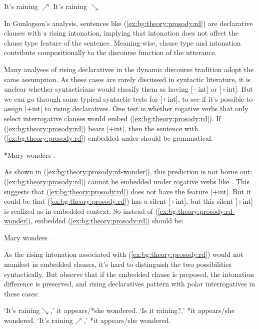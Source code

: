 It's raining $\nearrow$
\eex
{}
It's raining $\searrow$
\eex


In Gunlogson's \cite*{gunlogson2008} analysis, sentences like (\ref{ex:bg:theory:prosody:rd}) are declarative clauses with a rising intonation, implying that intonation does not affect the clause type feature of the sentence. Meaning-wise, clause type and intonation contribute compositionally to the discourse function of the utterance. 


Many analyses of rising declaratives in the dynamic discourse tradition adopt the same assumption. As these cases are rarely discussed in syntactic literature, it is unclear whether syntacticians would classify them as having [$-$int] or [$+$int]. But we can go through
some typical syntactic tests for
[$+$int], to see if it's possible to assign [$+$int] to
rising declaratives. One test is whether rogative verbs that only select interrogative clauses would embed (\ref{ex:bg:theory:prosody:rd}). If (\ref{ex:bg:theory:prosody:rd}) bears [+int], then the sentence with (\ref{ex:bg:theory:prosody:rd}) embedded under  should be grammatical.

*Mary wonders .
\eex

As shown in (\ref{ex:bg:theory:prosody:rd-wonder}), this prediction is not borne out; (\ref{ex:bg:theory:prosody:rd}) cannot be embedded under rogative verbs like . This suggests that (\ref{ex:bg:theory:prosody:rd}) does not have the feature [+int]. But it could be that (\ref{ex:bg:theory:prosody:rd}) has a silent [+int], but this silent [+int] is realized as  in embedded context. So instead of (\ref{ex:bg:theory:prosody:rd-wonder}), embedded (\ref{ex:bg:theory:prosody:rd}) should be:

Mary wonders .
\eex

As the rising intonation associated with (\ref{ex:bg:theory:prosody:rd}) would not manifest in embedded clauses, it's hard to distinguish the two possibilities syntactically. But \textcite{farkasroelofsen2017} observe that if the embedded clause is preposed, the intonation difference is preserved, and rising declaratives pattern with polar interrogatives in these cases:

\bxl{}
`It's raining$\searrow$,' it appears/*she wondered.
\ex`Is it raining?,' *it appears/she wondered.
\ex`It's raining$\nearrow$,' *it appears/she wondered.
\exl
\eex

